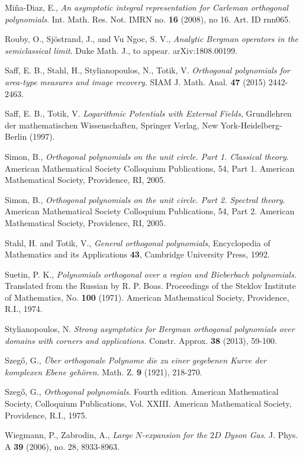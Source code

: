 \documentclass{amsart}
\theoremstyle{definition}
\theoremstyle{remark}
\numberwithin{equation}{subsection}
\begin{document}
\begin{thebibliography}{99}
 Mi\~na-Diaz, E., \emph{An asymptotic integral representation 
for Carleman orthogonal polynomials}. Int. Math. Res. Not. IMRN 
no. \textbf{16} (2008), no 16. Art. ID rnn065.

 Rouby, O., Sjöstrand, J., and Vu Ngoc, S. V., 
\emph{Analytic Bergman operators in the semiclassical limit}. 
Duke Math. J., to appear. arXiv:1808.00199.

 Saff, E. B., Stahl, H., Stylianopoulos, N., 
Totik, V. \emph{Orthogonal polynomials for area-type measures
and image recovery}. SIAM J. Math. Anal. \textbf{47} (2015) 2442-2463.

Saff, E. B., Totik, V. \emph{Logarithmic Potentials with External Fields},
Grundlehren der mathematischen Wissenschaften, 
Springer Verlag, New York-Heidelberg-Berlin
(1997). 

 Simon, B.,
\emph{Orthogonal polynomials on the unit circle. Part 1. 
Classical theory}. American Mathematical Society 
Colloquium Publications, 54, Part 1. American Mathematical Society, 
Providence, RI, 2005.

 Simon, B.,
\emph{Orthogonal polynomials on the unit circle. Part 2. Spectral theory}. 
American Mathematical Society Colloquium Publications, 
54, Part 2. American Mathematical Society, Providence, RI, 2005.

 Stahl, H. and Totik, V., \emph{General orthogonal
polynomials}, Encyclopedia of Mathematics and its Applications {\bf 43}, 
Cambridge University Press, 1992.

 Suetin, P. K., \emph{Polynomials orthogonal over a region and 
Bieberbach polynomials}. Translated from the Russian by R. P. Boas. 
Proceedings of the Steklov Institute of Mathematics, No. \textbf{100} (1971). 
American Mathematical Society, Providence, R.I., 1974. 


 Stylianopoulos, N. \emph{Strong asymptotics for Bergman 
orthogonal polynomials over domains with corners and applications.} 
Constr. Approx. \textbf{38} (2013), 59-100.


 Szeg{\H{o}}, G.,  \emph{\"Uber orthogonale Polynome 
die zu einer gegebenen Kurve der komplexen Ebene geh\"oren}. 
Math. Z. \textbf{9} (1921), 218-270. 

 Szeg{\H{o}}, G., \emph{Orthogonal polynomials}.
Fourth edition. American Mathematical Society, Colloquium Publications, 
Vol. XXIII. American Mathematical Society, Providence, R.I., 1975. 

Wiegmann, P., Zabrodin, A., \emph{Large $N$-expansion for the $2D$ Dyson Gas}.
J. Phys. A {\bf 39} (2006), no. 28, 8933-8963. 
\end{thebibliography}
\end{document}

